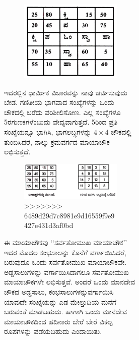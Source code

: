 \begin{figure}[H]
\begin{figure}[H]
\begin{figure}[H]
\begin{figure}[H]
\includegraphics[scale=.8]{src/figures/chap4/fig4.8.jpg}
\end{figure}
ಇದರಲ್ಲಿನ ಧಾರ್ಮಿಕ ವಿಚಾರ\-ವನ್ನು ನಾವು ಚರ್ಚಿಸುವುದು ಬೇಡ. ಗಣಿತೀಯ ಭಾಗವಾದ ಸಂಖ್ಯೆಗಳನ್ನು ಒಂದು ಚೌಕ\-ದಲ್ಲಿ ಬರೆದು ಪರಿಶೀಲಿಸೋಣ. ಎಲ್ಲ ಸಂಖ್ಯೆಗಳೂ 5ರ\break ಗುಣಕಗಳೆಂಬುದು ವೇದ್ಯವಾಗು\-ತ್ತದೆ. 5ರಿಂದ ಪ್ರತಿ ಸಂಖ್ಯೆಯನ್ನೂ ಭಾಗಿಸಿ, ಭಾಗಲಬ್ಧ\-ಗಳನ್ನು  $4 \times 4$ ಚೌಕದಲ್ಲಿ ತುಂಬಿಸಿದರೆ, ನಾಲ್ಕು ಕ್ರಮವರ್ಗದ ಮಾಯಾಚೌಕ ಲಭಿಸುತ್ತದೆ.
\begin{figure}[H]
\includegraphics[scale=.8]{src/figures/chap4/fig4.9.jpg}
>>>>>>> 6489d29d7c8981e9d16559f9e9427e431d3af0bd
\end{figure}

\newpage

ಈ ಮಾಯಾಚೌಕವು ‘‘ಸರ್ವತೋಮುಖ ಮಾಯಾಚೌಕ’’ ಇದರ ಮೊದಲ ಕಂಭ\break ಸಾಲನ್ನು ಕೊನೆಗೆ ವರ್ಗಾಯಿಸಿದರೆ, ಬರುವುದೂ ಒಂದು ಸರ್ವತೋಮುಖ ಮಾಯಾ\-ಚೌಕವೇ. ಅಡ್ಡಸಾಲುಗಳನ್ನು ವರ್ಗಾಯಿಸಿದಾಗಲೂ ಸರ್ವತೋಮುಖ ಮಾಯಾ\-ಚೌಕಗಳೇ ಲಭಿಸುತ್ತವೆ. ಅಂದರೆ ಒಂದು ಮಾನದೇವ ಚೌಕದ ಅಡ್ಡಸಾಲು, ಕಂಭಸಾಲುಗಳನ್ನು\break ವರ್ಗಾಯಿಸಿ ಯಾವುದೇ ಸಂಖ್ಯೆಯನ್ನು ಎಡ ಮೇಲ್ತುದಿಯ ಮನೆಗೆ ಬರುವಂತೆ ಮಾಡ\-ಬಹುದು. ಹಾಗಾಗಿ ಒಂದು ಮಾನದೇವ ಮಾಯಾಚೌಕದಿಂದ ಹದಿನಾರು ಬೇರೆ ಬೇರೆ ವಿಕಲ್ಪ ರೂಪಗಳನ್ನು ಪಡೆಯಬಹುದು ಎಂದಾಯಿತು.


\end{figure}
\end{figure}
\end{figure}
